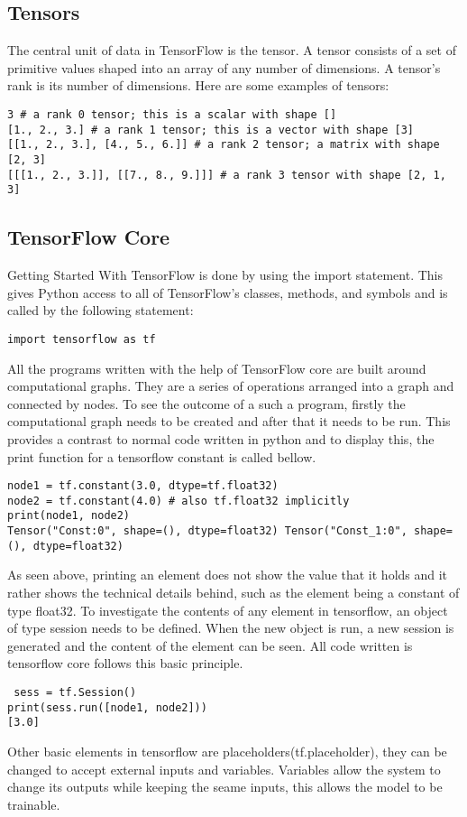 \subsection{Tensors}
The central unit of data in TensorFlow is the tensor. A tensor consists of a set of primitive values shaped into an array of any number of dimensions. A tensor's rank is its number of dimensions. Here are some examples of tensors:

\begin{verbatim}
3 # a rank 0 tensor; this is a scalar with shape []
[1., 2., 3.] # a rank 1 tensor; this is a vector with shape [3]
[[1., 2., 3.], [4., 5., 6.]] # a rank 2 tensor; a matrix with shape [2, 3]
[[[1., 2., 3.]], [[7., 8., 9.]]] # a rank 3 tensor with shape [2, 1, 3]
\end{verbatim} 


\subsection{TensorFlow Core}
Getting Started With TensorFlow is done by using the import statement. This gives Python access to all of TensorFlow's classes, methods, and symbols and is called by the following statement:

\begin{lstlisting}
import tensorflow as tf
\end{lstlisting}

All the programs written with the help of TensorFlow core are built around computational graphs. They are a series of operations arranged into a graph and connected by nodes. To see the outcome of a such a program, firstly the computational graph needs to be created and after that it needs to be run. This provides a contrast to normal code written in python and to display this, the print function for a tensorflow constant is called bellow.
\begin{lstlisting}
node1 = tf.constant(3.0, dtype=tf.float32)
node2 = tf.constant(4.0) # also tf.float32 implicitly
print(node1, node2)
Tensor("Const:0", shape=(), dtype=float32) Tensor("Const_1:0", shape=(), dtype=float32) 
\end{lstlisting}

As seen above, printing an element does not show the value that it holds and it rather shows the technical details behind, such as the element being a constant of type float32. To investigate the contents of any element in tensorflow, an object of type session needs to be defined. When the new object is run, a new session is generated and the content of the element can be seen. All code written is tensorflow core follows this basic principle.
 \begin{lstlisting}
 sess = tf.Session()
print(sess.run([node1, node2]))
[3.0]
\end{lstlisting}
Other basic elements in tensorflow are placeholders(tf.placeholder), they can be changed to accept external inputs and variables. Variables allow the system to change its outputs while keeping the seame inputs, this allows the model to be trainable. 

